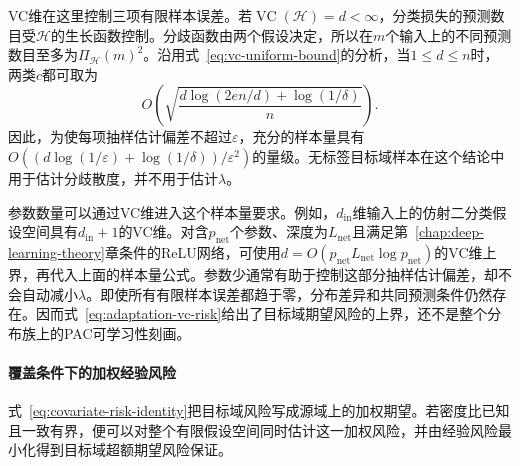 VC维在这里控制三项有限样本误差。若$\operatorname{VC}(\mathcal H)=d<\infty$，分类损失的预测数目受$\mathcal H$的生长函数控制。分歧函数由两个假设决定，所以在$m$个输入上的不同预测数目至多为$\Pi_{\mathcal H}(m)^2$。沿用式~\eqref{eq:vc-uniform-bound}的分析，当$1\leq d\leq n$时，两类$c$都可取为
\[
 O\!\left(\sqrt{\frac{d\log(2en/d)+\log(1/\delta)}{n}}\right).
\]
因此，为使每项抽样估计偏差不超过$\varepsilon$，充分的样本量具有
$O((d\log(1/\varepsilon)+\log(1/\delta))/\varepsilon^2)$的量级。无标签目标域样本在这个结论中用于估计分歧散度，并不用于估计$\lambda$。

参数数量可以通过VC维进入这个样本量要求。例如，$d_{\mathrm{in}}$维输入上的仿射二分类假设空间具有$d_{\mathrm{in}}+1$的VC维。对含$p_{\mathrm{net}}$个参数、深度为$L_{\mathrm{net}}$且满足第~\ref{chap:deep-learning-theory}章条件的ReLU网络，可使用$d=O(p_{\mathrm{net}}L_{\mathrm{net}}\log p_{\mathrm{net}})$的VC维上界，再代入上面的样本量公式。参数少通常有助于控制这部分抽样估计偏差，却不会自动减小$\lambda$。即使所有有限样本误差都趋于零，分布差异和共同预测条件仍然存在。因而式~\eqref{eq:adaptation-vc-risk}给出了目标域期望风险的上界，还不是整个分布族上的PAC可学习性刻画。

\paragraph{覆盖条件下的加权经验风险}
\label{sec:adaptation-coverage}

式~\eqref{eq:covariate-risk-identity}把目标域风险写成源域上的加权期望。若密度比已知且一致有界，便可以对整个有限假设空间同时估计这一加权风险，并由经验风险最小化得到目标域超额期望风险保证。

